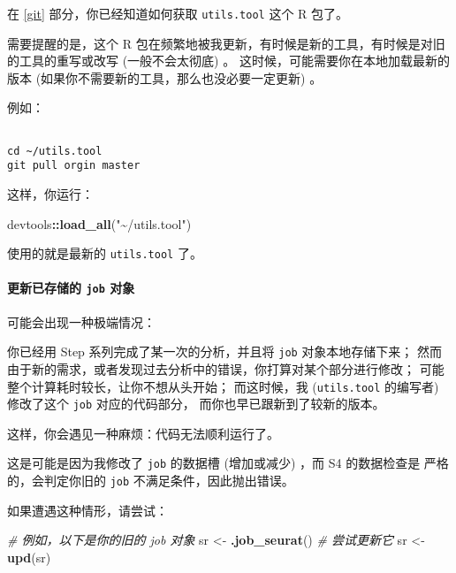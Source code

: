 \documentclass[
]{article}
\newenvironment{Shaded}{\begin{snugshade}}{\end{snugshade}}
\newcommand{\CommentTok}[1]{\textcolor[rgb]{0.56,0.35,0.01}{\textit{#1}}}
\newcommand{\KeywordTok}[1]{\textcolor[rgb]{0.13,0.29,0.53}{\textbf{#1}}}
\newcommand{\NormalTok}[1]{#1}
\newcommand{\OperatorTok}[1]{\textcolor[rgb]{0.81,0.36,0.00}{\textbf{#1}}}
\newcommand{\StringTok}[1]{\textcolor[rgb]{0.31,0.60,0.02}{#1}}
\begin{document}
在 \ref{git} 部分，你已经知道如何获取 \texttt{utils.tool} 这个 R 包了。

需要提醒的是，这个 R 包在频繁地被我更新，有时候是新的工具，有时候是对旧的工具的重写或改写 (一般不会太彻底) 。
这时候，可能需要你在本地加载最新的版本 (如果你不需要新的工具，那么也没必要一定更新) 。

例如：

\begin{tcolorbox}[colback = gray!10, colframe = red!50, width = 16cm, arc = 1mm, auto outer arc, title = {Bash input}]
\begin{verbatim}

cd ~/utils.tool
git pull orgin master

\end{verbatim}
\end{tcolorbox}

这样，你运行：

\begin{Shaded}
\begin{Highlighting}[]
\NormalTok{devtools}\OperatorTok{::}\KeywordTok{load\_all}\NormalTok{(}\StringTok{"\textasciitilde{}/utils.tool"}\NormalTok{)}
\end{Highlighting}
\end{Shaded}

使用的就是最新的 \texttt{utils.tool} 了。

\hypertarget{ux66f4ux65b0ux5df2ux5b58ux50a8ux7684-job-ux5bf9ux8c61}{%
\paragraph{\texorpdfstring{更新已存储的 \texttt{job} 对象}{更新已存储的 job 对象}}\label{ux66f4ux65b0ux5df2ux5b58ux50a8ux7684-job-ux5bf9ux8c61}}

可能会出现一种极端情况：

你已经用 Step 系列完成了某一次的分析，并且将 \texttt{job} 对象本地存储下来；
然而由于新的需求，或者发现过去分析中的错误，你打算对某个部分进行修改；
可能整个计算耗时较长，让你不想从头开始；
而这时候，我 (\texttt{utils.tool} 的编写者) 修改了这个 \texttt{job} 对应的代码部分，
而你也早已跟新到了较新的版本。

这样，你会遇见一种麻烦：代码无法顺利运行了。

这是可能是因为我修改了 \texttt{job} 的数据槽 (增加或减少) ，而 S4 的数据检查是
严格的，会判定你旧的 \texttt{job} 不满足条件，因此抛出错误。

如果遭遇这种情形，请尝试：

\begin{Shaded}
\begin{Highlighting}[]
\CommentTok{\# 例如，以下是你的旧的 \textasciigrave{}job\textasciigrave{} 对象}
\NormalTok{sr \textless{}{-}}\StringTok{ }\KeywordTok{.job\_seurat}\NormalTok{()}
\CommentTok{\# 尝试更新它}
\NormalTok{sr \textless{}{-}}\StringTok{ }\KeywordTok{upd}\NormalTok{(sr)}
\end{Highlighting}
\end{Shaded}
\end{document}
